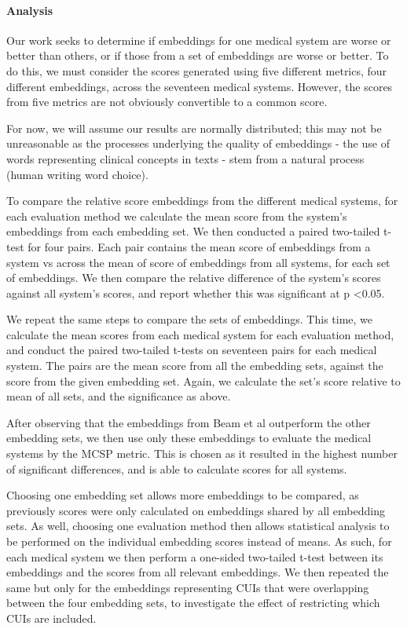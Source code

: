 \documentclass[10pt]{article}
\begin{document}
\paragraph{Analysis}
Our work seeks to determine if embeddings for one medical system are worse or better than others, or if those from a set of embeddings are worse or better. To do this, we must consider the scores generated using five different metrics, four different embeddings, across the seventeen medical systems. However, the scores from five metrics are not obviously convertible to a common score.  

For now, we will assume our results are normally distributed; this may not be unreasonable as the processes underlying the quality of embeddings - the use of words representing clinical concepts in texts - stem from a natural process (human writing word choice).

To compare the relative score embeddings from the different medical systems, for each evaluation method we calculate the mean score from the system's embeddings from each embedding set. We then conducted a paired two-tailed t-test for four pairs. Each pair contains the mean score of embeddings from a system vs across the mean of score of embeddings from all systems, for each set of embeddings. We then compare the relative difference of the system's scores against all system's scores, and report whether this was significant at p \textless 0.05. 

We repeat the same steps to compare the sets of embeddings. This time, we calculate the mean scores from each medical system for each evaluation method, and conduct the paired two-tailed t-tests on seventeen pairs for each medical system. The pairs are the mean score from all the embedding sets, against the score from the given embedding set. Again, we calculate the set's score relative to mean of all sets, and the significance as above. 

After observing that the embeddings from Beam et al outperform the other embedding sets, we then use only these embeddings to evaluate the medical systems by the MCSP metric. This is chosen as it resulted in the highest number of significant differences, and is able to calculate scores for all systems. 

Choosing one embedding set allows more embeddings to be compared, as previously scores were only calculated on embeddings shared by all embedding sets. As well, choosing one evaluation method then allows statistical analysis to be performed on the individual embedding scores instead of means. As such, for each medical system we then perform a one-sided two-tailed t-test between its embeddings and the scores from all relevant embeddings. We then repeated the same but only for the embeddings representing CUIs that were overlapping between the four embedding sets, to investigate the effect of restricting which CUIs are included.  
\end{document}
